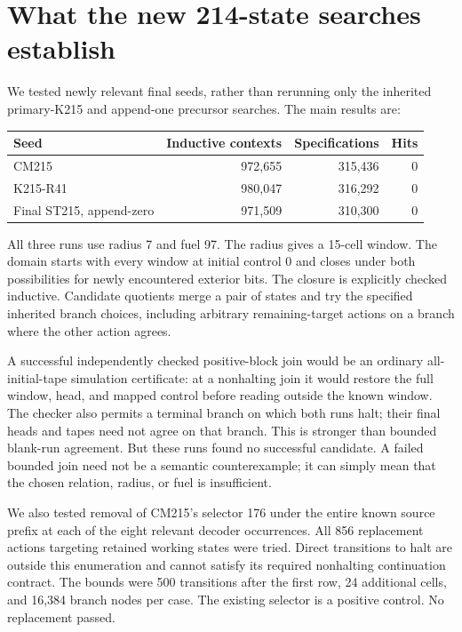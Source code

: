 \documentclass[11pt]{article}
\begin{document}


\section{What the new 214-state searches establish}

We tested newly relevant final seeds, rather than rerunning only the inherited primary-K215 and append-one precursor searches. The main results are:
\begin{center}
\begin{tabular}{@{}lrrr@{}}
\toprule
Seed & Inductive contexts & Specifications & Hits \\
\midrule
CM215 & 972,655 & 315,436 & 0 \\
K215-R41 & 980,047 & 316,292 & 0 \\
Final ST215, append-zero & 971,509 & 310,300 & 0 \\
\bottomrule
\end{tabular}
\end{center}
All three runs use radius 7 and fuel 97. The radius gives a 15-cell window. The domain starts with every window at initial control 0 and closes under both possibilities for newly encountered exterior bits. The closure is explicitly checked inductive. Candidate quotients merge a pair of states and try the specified inherited branch choices, including arbitrary remaining-target actions on a branch where the other action agrees.

A successful independently checked positive-block join would be an ordinary all-initial-tape simulation certificate: at a nonhalting join it would restore the full window, head, and mapped control before reading outside the known window. The checker also permits a terminal branch on which both runs halt; their final heads and tapes need not agree on that branch. This is stronger than bounded blank-run agreement. But these runs found no successful candidate. A failed bounded join need not be a semantic counterexample; it can simply mean that the chosen relation, radius, or fuel is insufficient.

We also tested removal of CM215's selector 176 under the entire known source prefix at each of the eight relevant decoder occurrences. All 856 replacement actions targeting retained working states were tried. Direct transitions to halt are outside this enumeration and cannot satisfy its required nonhalting continuation contract. The bounds were 500 transitions after the first row, 24 additional cells, and 16,384 branch nodes per case. The existing selector is a positive control. No replacement passed.
\end{document}

